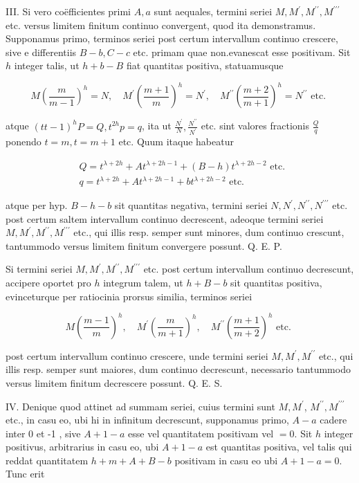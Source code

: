 \documentclass[10pt]{article}
\begin{document}
III. Si vero coëfficientes primi \(A, a\) sunt aequales, termini seriei \(M, M^{\prime}, M^{\prime \prime}, M^{\prime \prime \prime}\) etc. versus limitem finitum continuo convergent, quod ita demonstramus. Supponamus primo, terminos seriei post certum intervallum continuo crescere, sive e differentiis \(B-b, C-c\) etc. primam quae non.evanescat
esse positivam. Sit \(h\) integer talis, ut \(h+b-B\) fiat quantitas positiva, statuamusque

\[
M\left(\frac{m}{m-1}\right)^{h}=N, \quad M^{\prime}\left(\frac{m+1}{m}\right)^{h}=N^{\prime}, \quad M^{\prime \prime}\left(\frac{m+2}{m+1}\right)^{h}=N^{\prime \prime} \text { etc. }
\]

atque \((t t-1)^{h} P=Q, t^{2 h} p=q\), ita ut \(\frac{N^{\prime}}{N}, \frac{N^{\prime \prime}}{N^{\prime}}\) etc. sint valores fractionis \(\frac{Q}{q}\) ponendo \(t=m, t=m+1\) etc. Quum itaque habeatur

\[
\begin{aligned}
& Q=t^{\lambda+2 h}+A t^{\lambda+2 h-1}+(B-h) t^{\lambda+2 h-2} \text { etc. } \\
& q=t^{\lambda+2 h}+A t^{\lambda+2 h-1}+b t^{\lambda+2 h-2} \text { etc. }
\end{aligned}
\]

atque per hyp. \(B-h-b\) sit quantitas negativa, termini seriei \(N, N^{\prime}, N^{\prime \prime}, N^{\prime \prime \prime}\) etc. post certum saltem intervallum continuo decrescent, adeoque termini seriei \(M, M^{\prime}, M^{\prime \prime}, M^{\prime \prime \prime}\) etc., qui illis resp. semper sunt minores, dum continuo crescunt, tantummodo versus limitem finitum convergere possunt. Q. E. P.

Si termini seriei \(M, M^{\prime}, M^{\prime \prime}, M^{\prime \prime \prime}\) etc. post certum intervallum continuo decrescunt, accipere oportet pro \(h\) integrum talem, ut \(h+B-b\) sit quantitas positiva, evinceturque per ratiocinia prorsus similia, terminos seriei

\[
M\left(\frac{m-1}{m}\right)^{h}, \quad M^{\prime}\left(\frac{m}{m+1}\right)^{h}, \quad M^{\prime \prime}\left(\frac{m+1}{m+2}\right)^{h} \text { etc. }
\]

post certum intervallum continuo crescere, unde termini seriei \(M, M^{\prime}, M^{\prime \prime}\) etc., qui illis resp. semper sunt maiores, dum continuo decrescunt, necessario tantummodo versus limitem finitum decrescere possunt. Q. E. S.

IV. Denique quod attinet ad summam seriei, cuius termini sunt \(M, M^{\prime}\), \(M^{\prime \prime}, M^{\prime \prime \prime}\) etc., in casu eo, ubi hi in infinitum decrescunt, supponamus primo, \(A-a\) cadere inter 0 et -1 , sive \(A+1-a\) esse vel quantitatem positivam vel \(=0\). Sit \(h\) integer positivus, arbitrarius in casu eo, ubi \(A+1-a\) est quantitas positiva, vel talis qui reddat quantitatem \(h+m+A+B-b\) positivam in casu eo ubi \(A+1-a=0\). Tunc erit
\end{document}
